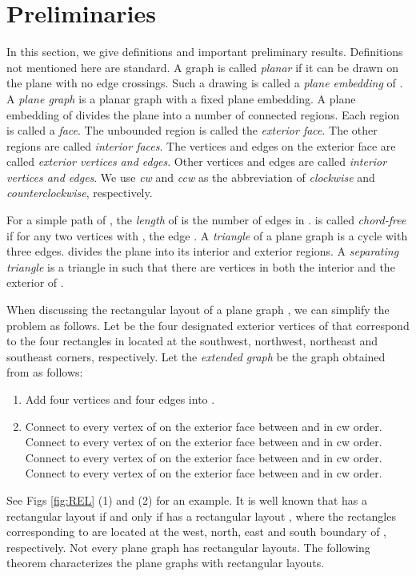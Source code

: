 \documentclass[11pt]{article}
\begin{document}
\section{Preliminaries}\label{sec:pre-universal}


In this section, we give definitions and important preliminary results.
Definitions not mentioned here are standard. A graph  is called
{\em planar} if it can be drawn on the plane with no edge
crossings. Such a drawing is called a {\em plane embedding} of .
A {\em plane graph} is a planar graph with a fixed plane embedding.
A plane embedding of  divides the plane into a number of connected
regions. Each region is called a {\em face}. The unbounded region is called
the {\em exterior face}. The other regions are called {\em interior faces}.
The vertices and edges on the exterior face are called {\em exterior
vertices and edges}. Other vertices and edges are called {\em interior vertices
and edges}. We use {\em cw} and {\em ccw} as the abbreviation of {\em clockwise}
and {\em counterclockwise}, respectively.

For a simple path  of , the {\em length}
of  is the number of edges in .  is called \emph{chord-free} if
for any two vertices  with , the edge .
A {\em triangle} of a plane graph  is a cycle  with three edges.
 divides the plane into its interior and exterior regions.
A {\em separating triangle} is a triangle in  such that
there are vertices in both the interior and the exterior of .

When discussing the rectangular layout  of a plane graph , we can simplify
the problem as follows. Let  be the four designated exterior vertices of 
that correspond to the four rectangles in  located at the southwest,
northwest, northeast and southeast corners, respectively. Let the
{\em extended graph}  be the graph obtained from  as follows:

\begin{enumerate}
\item Add four vertices  and four edges
 into .
\item
Connect  to every vertex of  on the exterior face between  and 
in cw order.
Connect  to every vertex of  on the exterior face between  and 
in cw order.
Connect  to every vertex of  on the exterior face between  and 
in cw order.
Connect  to every vertex of  on the exterior face between  and 
in cw order.
\end{enumerate}

See Figs \ref{fig:REL} (1) and (2) for an example.
It is well known \cite{KK85} that
 has a rectangular layout  if and only if  has a
rectangular layout , where the rectangles corresponding to
 are located at the west, north, east and south boundary
of , respectively.
Not every plane graph has rectangular layouts. The following
theorem characterizes the plane graphs with rectangular layouts.
\end{document}
